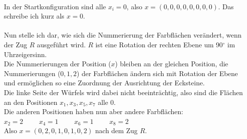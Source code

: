 \documentclass[12pt,a4paper, usenames, dvipsnames]{scrartcl}
\begin{document}
\ \\
In der Startkonfiguration sind alle $x_i = 0$, also $x=(0, 0, 0, 0, 0, 0, 0, 0)$. Das schreibe ich kurz als $x=0$.\\
\ \\
Nun stelle ich dar, wie sich die Nummerierung der Farbflächen verändert, wenn der Zug $R$ ausgeführt wird. $R$ ist eine Rotation der rechten Ebene um 90$^\circ$ im Uhrzeigersinn. \\
Die Nummerierungen der Position ($x$) bleiben an der gleichen Position, die Nummerierungen ($0, 1, 2$) der Farbflächen ändern sich mit Rotation der Ebene und ermöglichen so eine Zuordnung der Ausrichtung der Ecksteine. \\
Die linke Seite der Würfels wird dabei nicht beeinträchtig, also sind die Flächen an den Positionen $x_1, x_3, x_5, x_7$ alle 0. \\
Die anderen Positionen haben nun aber andere Farbflächen: \\
$x_2 = 2$ \ \ \ \ $x_4 = 1$ \ \ \ \ $x_6 = 1$ \ \ \ \ $x_8 = 2$  \\
Also $x = (0, 2, 0, 1, 0, 1, 0, 2)$ nach dem Zug $R$. \\
\end{document}
